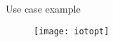 \begin{frame}{Use case example}

  \begin{figure}
    \centering
    \texttt{[image: iotopt]}
  \end{figure}

\end{frame}